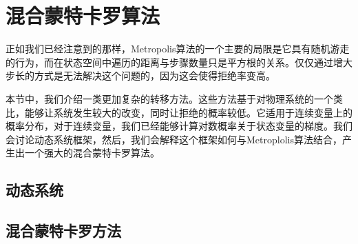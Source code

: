 \section{混合蒙特卡罗算法}
正如我们已经注意到的那样，Metropolis算法的一个主要的局限是它具有随机游走的行为，而在状态空间中遍历的距离与步骤数量只是平方根的关系。仅仅通过增大步长的方式是无法解决这个问题的，因为这会使得拒绝率变高。

本节中，我们介绍一类更加复杂的转移方法。这些方法基于对物理系统的一个类比，能够让系统发生较大的改变，同时让拒绝的概率较低。它适用于连续变量上的概率分布，对于连续变量，我们已经能够计算对数概率关于状态变量的梯度。我们会讨论动态系统框架，然后，我们会解释这个框架如何与Metroplolis算法结合，产生出一个强大的混合蒙特卡罗算法。
\subsection*{动态系统}
\subsection*{混合蒙特卡罗方法}
